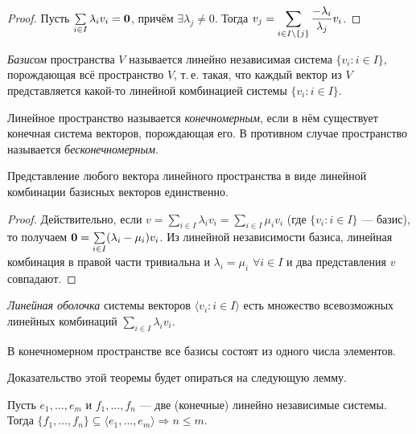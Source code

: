 \begin{proof}
    Пусть $\sum\limits_{i \in I}\lambda_iv_i = \boldsymbol{0}$, причём $\exists\lambda_j \ne 0$. Тогда $\displaystyle v_j = \sum_{i \in I \setminus \{j\}}\frac{-\lambda_i}{\lambda_j}v_i$.
\end{proof}

\begin{definition}
    \textit{Базисом} пространства $V$ называется линейно независимая система $\{v_i : i \in I\}$, порождающая всё пространство $V$, т.\,е. такая, что каждый вектор из $V$ представляется какой-то линейной комбинацией системы $\{v_i : i \in I\}$.
\end{definition}

\begin{definition}
    Линейное пространство называется \textit{конечномерным}, если в нём существует конечная система векторов, порождающая его. В противном случае пространство называется \textit{бесконечномерным}.
\end{definition}

\begin{proposal}
    Представление любого вектора линейного пространства в виде линейной комбинации базисных векторов единственно.
\end{proposal}

\begin{proof}
    Действительно, если $v = \sum\limits_{i \in I}\lambda_iv_i = \sum\limits_{i \in I}\mu_iv_i$ (где $\{v_i : i \in I\}$ --- базис), то получаем $\boldsymbol{0} = \sum\limits_{i \in I}(\lambda_i - \mu_i)v_i$. Из линейной независимости базиса, линейная комбинация в правой части тривиальна и $\lambda_i = \mu_i$ $\forall i \in I$ и два представления $v$ совпадают.
\end{proof}

\begin{definition}
    \textit{Линейная оболочка} системы векторов $\langle v_i : i \in I \rangle$ есть множество всевозможных линейных комбинаций $\sum\limits_{i \in I}\lambda_iv_i$.
\end{definition}

\begin{theorem}
    В конечномерном пространстве все базисы состоят из одного числа элементов.
\end{theorem}

Доказательство этой теоремы будет опираться на следующую лемму.

\begin{lemma}
    Пусть $e_1, \ldots, e_m$ и $f_1, \ldots, f_n$ --- две (конечные) линейно независимые системы. Тогда $\{f_1, \ldots, f_n\} \subseteq \langle e_1, \ldots, e_m\rangle \Rightarrow n \leqslant m$.
\end{lemma}

